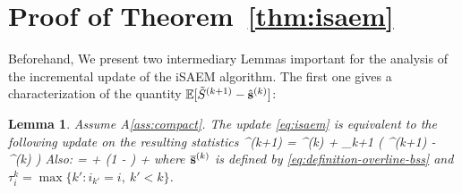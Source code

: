 \documentclass[11pt]{article}
\newtheorem*{Lemma*}{Lemma}
\theoremstyle{t}
\begin{document}

\section{Proof of Theorem~\ref{thm:isaem}}\label{app:theoremisaem}
Beforehand, We present two intermediary Lemmas important for the analysis of the incremental update of the iSAEM algorithm.
The first one gives a characterization of the quantity $\EE[\tilde{S}^{(k+1)} - \hat{\bss}^{(k)}]$:
\begin{Lemma*}
 Assume A\ref{ass:compact}. The update \eqref{eq:isaem} is equivalent to the following update on the resulting statistics 
\beq\notag
\hat{\bss}^{(k+1)} =  \hat{\bss}^{(k)}  + \gamma_{k+1} \big( ^{(k+1)} - \hat{\bss}^{(k)} \big)
\eeq 
Also:
\beq\notag
{} =  + \left(1 -  \right) \EE\left[\frac{1}{n} \sum_{i=1}^n \tilde{S}_i^{(\tau_i^k)}- \overline{\bss}^{(k)}\right]  +\EE[\eta_{i_k}^{(k+1)}]
\eeq
where $\overline{\bss}^{(k)}$ is defined by \eqref{eq:definition-overline-bss} and $\tau_i^k = \max \{ k' : i_{k'} = i,~k' < k \}$.
\end{Lemma*}
\end{document}
